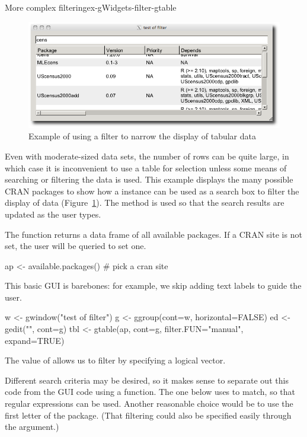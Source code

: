 \begin{example}{More complex filtering}{ex-gWidgets-filter-gtable}
%
\begin{figure}
  \centering
  \includegraphics[width=.8\textwidth]{fig-gWidgets-filter-example}
  \caption{Example of using a filter to narrow the display of tabular data}
  \label{fig:gWidgets-filter-example}
\end{figure}
%
Even with moderate-sized data sets, the number of rows can be quite large, in which case it is
inconvenient to use a table for selection unless some means of searching or filtering the
data is used. This example displays the many possible CRAN packages to show how a
 instance can be used as a search box to filter the display of
data (Figure~\ref{fig:gWidgets-filter-example}). The  method is used so that the search
results are updated as the user types.


The  function returns a data frame of all
available packages. If a CRAN site is not set, the user will be
queried to set one.
\begin{Schunk}
\begin{Sinput}
 ap <- available.packages()       # pick a cran site
\end{Sinput}
\end{Schunk}

This basic GUI is barebones: for example, we skip adding text labels to guide the user. 
\begin{Schunk}
\begin{Sinput}
 w <- gwindow("test of filter")
 g <- ggroup(cont=w, horizontal=FALSE)
 ed <- gedit("", cont=g)
 tbl <- gtable(ap, cont=g, filter.FUN="manual", expand=TRUE)
\end{Sinput}
\end{Schunk}
The  value of  allows us to
filter by specifying a logical vector.

Different search criteria may be desired, so it makes sense to
separate out this code from the GUI code using a function. The one below
uses  to match, so that regular expressions can be
used. Another reasonable choice would be to use the first letter of
the package. (That filtering could also be specified easily through the
 argument.)


\end{example}
